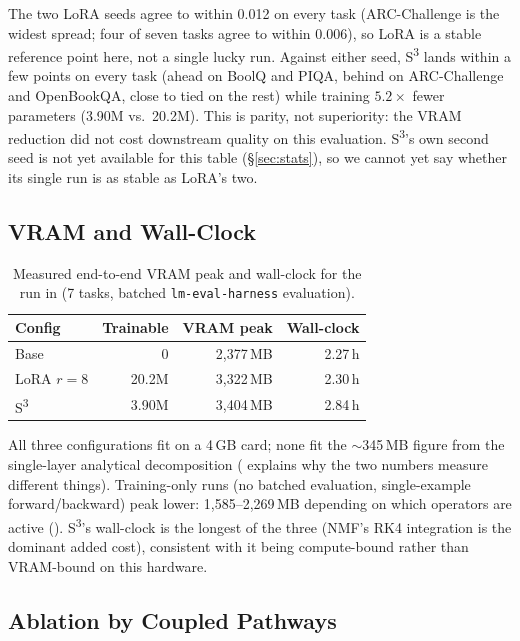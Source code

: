 \documentclass[conference]{IEEEtran}
\newcommand{\sthree}{S\textsuperscript{3}}
\begin{document}
The two LoRA seeds agree to within 0.012 on every task (ARC-Challenge is the widest spread; four of seven tasks agree to within 0.006), so LoRA is a stable reference point here, not a single lucky run. Against either seed, \sthree{} lands within a few points on every task (ahead on BoolQ and PIQA, behind on ARC-Challenge and OpenBookQA, close to tied on the rest) while training $5.2\times$ fewer parameters (3.90M vs.\ 20.2M). This is parity, not superiority: the VRAM reduction did not cost downstream quality on this evaluation. \sthree{}'s own second seed is not yet available for this table (\S\ref{sec:stats}), so we cannot yet say whether its single run is as stable as LoRA's two.

\subsection{VRAM and Wall-Clock}

\begin{table}[t]
\centering
\caption{Measured end-to-end VRAM peak and wall-clock for the run in  (7 tasks, batched \texttt{lm-eval-harness} evaluation).}
\label{tab:vram}
\footnotesize
\setlength{\tabcolsep}{4pt}
\begin{tabular}{@{}lrrr@{}}
\toprule
\textbf{Config} & \textbf{Trainable} & \textbf{VRAM peak} & \textbf{Wall-clock} \\
\midrule
Base           & 0            & 2{,}377\,MB & 2.27\,h \\
LoRA $r{=}8$   & 20.2M        & 3{,}322\,MB & 2.30\,h \\
\sthree{}      & 3.90M        & 3{,}404\,MB & 2.84\,h \\
\bottomrule
\end{tabular}
\end{table}

All three configurations fit on a 4\,GB card; none fit the $\sim$345\,MB figure from the single-layer analytical decomposition ( explains why the two numbers measure different things). Training-only runs (no batched evaluation, single-example forward/backward) peak lower: 1{,}585--2{,}269\,MB depending on which operators are active (). \sthree{}'s wall-clock is the longest of the three (NMF's RK4 integration is the dominant added cost), consistent with it being compute-bound rather than VRAM-bound on this hardware.

\subsection{Ablation by Coupled Pathways}
\label{sec:pathways}
\end{document}
